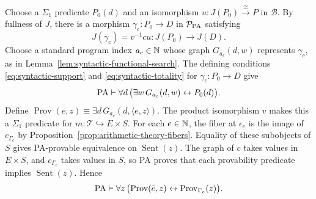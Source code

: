 Choose a $\Sigma_1$ predicate $P_0(d)$ and an
isomorphism $u:J(P_0)\xrightarrow{\cong}P$ in $\mathcal B$.
By fullness of $J$, there is a morphism
$\gamma_c:P_0\to D$ in $\mathcal P_{\mathrm{PA}}$ satisfying
\[
 J(\gamma_c)=v^{-1}cu:J(P_0)\longrightarrow J(D).
\]
Choose a standard program index $a_c\in\mathbb N$ whose graph
$G_{a_c}(d,w)$ represents $\gamma_c$, as in
Lemma~\ref{lem:syntactic-functional-search}. The defining conditions
\eqref{eq:syntactic-support} and \eqref{eq:syntactic-totality}
for $\gamma_c:P_0\to D$ give
\[
 \mathrm{PA}\vdash\forall d\,
     \bigl(\exists w\,G_{a_c}(d,w)\leftrightarrow P_0(d)\bigr).
\]
Define $\operatorname{Prov}(e,z)
\equiv\exists d\,G_{a_c}(d,\langle e,z\rangle)$.
The product isomorphism $v$ makes this a $\Sigma_1$
predicate for $m:\mathcal T\hookrightarrow E\times S$.
For each $e\in\mathbb N$, the fiber at $\epsilon_e$ is the image of
$c_{\Gamma_e}$ by Proposition~\ref{prop:arithmetic-theory-fibers}. Equality
of these subobjects of $S$ gives PA-provable equivalence on
$\operatorname{Sent}(z)$. The graph of $c$ takes values in $E\times S$,
and $c_{\Gamma_e}$ takes values in $S$, so PA proves that each
provability predicate implies $\operatorname{Sent}(z)$. Hence
\[
 \mathrm{PA}\vdash\forall z\,
   \bigl(\operatorname{Prov}(\bar e,z)
       \leftrightarrow\operatorname{Prov}_{\Gamma_e}(z)\bigr).
\]

